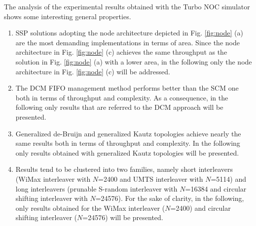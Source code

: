 \documentclass[10pt,twocolumn,journal]{IEEEtran}
\begin{document}
The analysis of the experimental results obtained with the Turbo NOC simulator shows some interesting general properties. 
\begin{enumerate}
\item SSP solutions adopting the node architecture depicted in Fig. \ref{fig:node} (a) 
are the most demanding implementations in terms of area. Since the node architecture in Fig. \ref{fig:node} (c) achieves 
the same throughput as the solution in Fig. \ref{fig:node} (a) with a lower area, in the following only the node 
architecture in Fig. \ref{fig:node} (c) will be addressed.
\item The DCM FIFO management method performs better than the SCM one both in terms of throughput and complexity. 
As a consequence, in the following only results that are referred to the DCM approach will be presented.
\item Generalized de-Bruijn and generalized Kautz topologies achieve nearly the same results 
both in terms of throughput and complexity. In the following only results obtained with generalized Kautz topologies will 
be presented.
\item Results tend to be clustered into two families, namely short interleavers (WiMax interleaver with $N$=2400 and UMTS interleaver with 
$N$=5114) and long interleavers (prunable S-random interleaver with $N$=16384 and circular shifting interleaver 
with $N$=24576). For the sake of clarity, in the following, only results obtained for the WiMax interleaver ($N$=2400) and 
circular shifting interleaver ($N$=24576) will be presented.
\end{enumerate}
\end{document}
